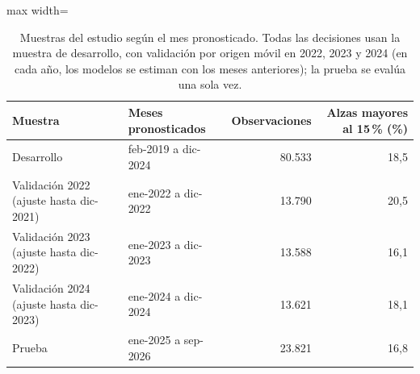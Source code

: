 \begin{table}[htbp]\centering\small
\caption{Muestras del estudio según el mes pronosticado. Todas las decisiones usan la muestra de desarrollo, con validación por origen móvil en 2022, 2023 y 2024 (en cada año, los modelos se estiman con los meses anteriores); la prueba se evalúa una sola vez.}\label{tab:muestras}
\begin{adjustbox}{max width=\textwidth}\begin{tabular}{llrr}\toprule
Muestra & Meses pronosticados & Observaciones & Alzas mayores al 15\,\% (\%)\\ \midrule
Desarrollo & feb-2019 a dic-2024 & 80.533 & 18{,}5 \\
\quad Validación 2022 (ajuste hasta dic-2021) & ene-2022 a dic-2022 & 13.790 & 20{,}5 \\
\quad Validación 2023 (ajuste hasta dic-2022) & ene-2023 a dic-2023 & 13.588 & 16{,}1 \\
\quad Validación 2024 (ajuste hasta dic-2023) & ene-2024 a dic-2024 & 13.621 & 18{,}1 \\
Prueba & ene-2025 a sep-2026 & 23.821 & 16{,}8 \\
\bottomrule\end{tabular}\end{adjustbox}\end{table}
